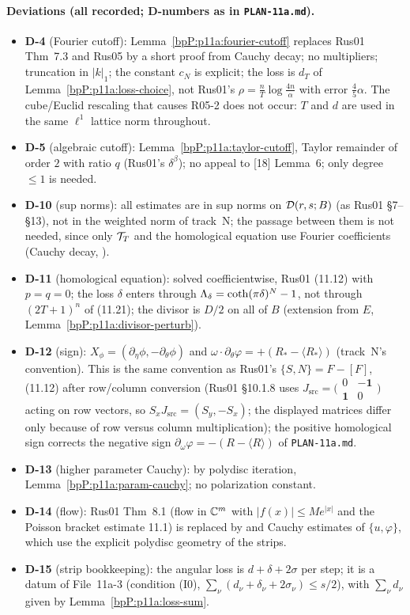 \paragraph{Deviations (all recorded; D-numbers as in \texttt{PLAN-11a.md}).}
\begin{itemize}
\item \textbf{D-4} (Fourier cutoff): Lemma~\ref{bpP:p11a:fourier-cutoff} replaces Rus01 Thm~7.3 and Rus05 by a short proof from Cauchy decay; no multipliers; truncation in $\lvert k\rvert_1$; the constant $c_N$ is explicit; the loss is $d_T$ of Lemma~\ref{bpP:p11a:loss-choice}, not Rus01's $\rho=\frac nT\log\frac{4n}\alpha$ with error $\frac45\alpha$. The cube/Euclid rescaling that causes R05-2 does not occur: $T$ and $d$ are used in the same $\ell^1$ lattice norm throughout.
\item \textbf{D-5} (algebraic cutoff): Lemma~\ref{bpP:p11a:taylor-cutoff}, Taylor remainder of order $2$ with ratio $q$ (Rus01's $\delta^{\beta}$); no appeal to [18] Lemma~6; only degree $\le1$ is needed.
\item \textbf{D-10} (sup norms): all estimates are in sup norms on $\mathcal D(r,s;B)$ (as Rus01 \S7--\S13), not in the weighted norm of track~N; the passage between them is not needed, since only $\mathcal T_T$ and the homological equation use Fourier coefficients (Cauchy decay, ).
\item \textbf{D-11} (homological equation): solved coefficientwise, Rus01 (11.12) with $p=q=0$; the loss $\delta$ enters through $\Lambda_{\delta}=\coth(\pi\delta)^N-1$, not through $(2T+1)^n$ of (11.21); the divisor is $D/2$ on all of $B$ (extension from $E$, Lemma~\ref{bpP:p11a:divisor-perturb}).
\item \textbf{D-12} (sign): $X_\phi=(\partial_\eta\phi,-\partial_\theta\phi)$ and $\omega\cdot\partial_\theta\varphi=+(R_*-\langle R_*\rangle)$ (track~N's convention). This is the same convention as Rus01's $\{S,N\}=F-[F]$, (11.12) after row/column conversion (Rus01 \S10.1.8 uses $J_{\mathrm{src}}=\bigl(\begin{smallmatrix}0&-\mathbf 1\\ \mathbf 1&0\end{smallmatrix}\bigr)$ acting on row vectors, so $S_xJ_{\mathrm{src}}=(S_y,-S_x)$; the displayed matrices differ only because of row versus column multiplication); the positive homological sign corrects the negative sign $\partial_\omega\varphi=-(R-\langle R\rangle)$ of \texttt{PLAN-11a.md}.
\item \textbf{D-13} (higher parameter Cauchy): by polydisc iteration, Lemma~\ref{bpP:p11a:param-cauchy}; no polarization constant.
\item \textbf{D-14} (flow): Rus01 Thm~8.1 (flow in $\mathbb{C}^m$ with $\lvert f(x)\rvert\le Me^{\lvert x\rvert}$ and the Poisson bracket estimate 11.1) is replaced by  and Cauchy estimates of $\{u,\varphi\}$, which use the explicit polydisc geometry of the strips.
\item \textbf{D-15} (strip bookkeeping): the angular loss is $d+\delta+2\sigma$ per step; it is a datum of File~11a-3 (condition (I0), $\sum_\nu(d_\nu+\delta_\nu+2\sigma_\nu)\le s/2$), with $\sum_\nu d_\nu$ given by Lemma~\ref{bpP:p11a:loss-sum}.
\end{itemize}

